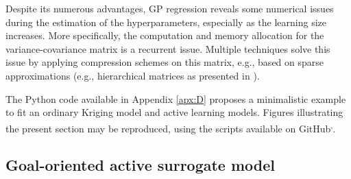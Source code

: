 Despite its numerous advantages, GP regression reveals some numerical issues during the estimation of the hyperparameters, especially as the learning size increases. 
More specifically, the computation and memory allocation for the variance-covariance matrix is a recurrent issue. 
Multiple techniques solve this issue by applying compression schemes on this matrix, e.g., based on sparse approximations (e.g., hierarchical matrices as presented in \citealp{geoga_2020_hmat_gp}). 



\begin{otexample}
    The Python code available in Appendix \ref{apx:D} proposes a minimalistic \ots example to fit an ordinary Kriging model and active learning models. 
    Figures illustrating the present section may be reproduced, using the \ots scripts available on GitHub\footnotemark[13]\textsuperscript{,}\footnotemark[14].  
\end{otexample}



\subsection{Goal-oriented active surrogate model}\label{sec:active_surrogates}

